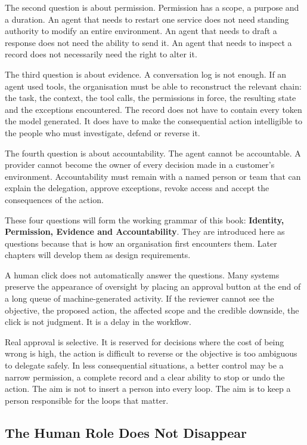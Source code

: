 The second question is about permission. Permission has a scope, a
purpose and a duration. An agent that needs to restart one service does
not need standing authority to modify an entire environment. An agent
that needs to draft a response does not need the ability to send it. An
agent that needs to inspect a record does not necessarily need the right
to alter it.

The third question is about evidence. A conversation log is not enough.
If an agent used tools, the organisation must be able to reconstruct the
relevant chain: the task, the context, the tool calls, the permissions
in force, the resulting state and the exceptions encountered. The record
does not have to contain every token the model generated. It does have
to make the consequential action intelligible to the people who must
investigate, defend or reverse it.

The fourth question is about accountability. The agent cannot be
accountable. A provider cannot become the owner of every decision made
in a customer's environment. Accountability must remain with a named
person or team that can explain the delegation, approve exceptions,
revoke access and accept the consequences of the action.

These four questions will form the working grammar of this book:
\textbf{Identity, Permission, Evidence and Accountability}. They are
introduced here as questions because that is how an organisation first
encounters them. Later chapters will develop them as design
requirements.

A human click does not automatically answer the questions. Many systems
preserve the appearance of oversight by placing an approval button at
the end of a long queue of machine-generated activity. If the reviewer
cannot see the objective, the proposed action, the affected scope and
the credible downside, the click is not judgment. It is a delay in the
workflow.

Real approval is selective. It is reserved for decisions where the cost
of being wrong is high, the action is difficult to reverse or the
objective is too ambiguous to delegate safely. In less consequential
situations, a better control may be a narrow permission, a complete
record and a clear ability to stop or undo the action. The aim is not to
insert a person into every loop. The aim is to keep a person responsible
for the loops that matter.

\subsection{The Human Role Does Not
Disappear}\label{the-human-role-does-not-disappear}

